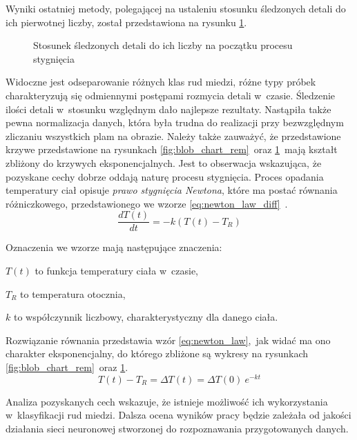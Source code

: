 Wyniki ostatniej metody, polegającej na ustaleniu stosunku śledzonych detali
do ich pierwotnej liczby, został przedstawiona na rysunku
\ref{fig:blob_chart_ratio}.~%
\begin{figure}[tb]
    \centering
    
    \caption{Stosunek śledzonych detali do ich liczby na początku procesu
        stygnięcia}
    \label{fig:blob_chart_ratio}
\end{figure}
Widoczne jest odseparowanie różnych klas rud miedzi, różne typy próbek
charakteryzują się odmiennymi postępami rozmycia detali w~czasie.
Śledzenie ilości detali w~stosunku względnym dało najlepsze rezultaty.
Nastąpiła także pewna normalizacja danych, która była trudna do realizacji przy
bezwzględnym zliczaniu wszystkich plam na obrazie.
Należy także zauważyć, że przedstawione krzywe przedstawione na rysunkach
\ref{fig:blob_chart_rem}~oraz \ref{fig:blob_chart_ratio}~mają kształt zbliżony
do krzywych eksponencjalnych.
Jest to obserwacja wskazująca, że pozyskane cechy dobrze oddają naturę procesu
stygnięcia.
Proces opadania temperatury ciał opisuje \emph{prawo stygnięcia Newtona}, które
ma postać równania różniczkowego, przedstawionego we wzorze
\ref{eq:newton_law_diff}~\cite{lienhard_heat}.
\begin{equation}
    \frac{dT \left( t \right)}{dt}=-k\left( T \left( t \right) -T_{R} \right)
    \label{eq:newton_law_diff}
\end{equation}%
\begin{samepage}
Oznaczenia we wzorze mają następujące znaczenia:
\begin{description}
    \item $ T \left( t \right) $ to funkcja temperatury ciała w~czasie,
    \item $ T_R $ to temperatura otocznia,
    \item $ k $ to współczynnik liczbowy, charakterystyczny dla danego ciała.
\end{description}
\end{samepage}
Rozwiązanie równania przedstawia wzór \ref{eq:newton_law},~jak widać ma ono
charakter eksponencjalny, do którego zbliżone są wykresy na rysunkach
\ref{fig:blob_chart_rem}~oraz \ref{fig:blob_chart_ratio}.
\begin{equation}
    T(t) - T_{R} = \Delta T (t) = \Delta T (0) \ e^ {-k t}
    \label{eq:newton_law}
\end{equation}

Analiza pozyskanych cech wskazuje, że istnieje możliwość ich wykorzystania
w~klasyfikacji rud miedzi.
Dalsza ocena wyników pracy będzie zależała od jakości działania sieci neuronowej
stworzonej do rozpoznawania przygotowanych danych.

